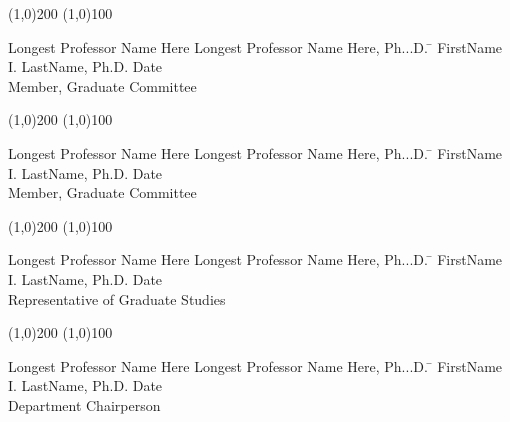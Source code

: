   \noindent
\line(1,0){200} \hspace{40 mm} \line(1,0){100}\\
  \noindent
\vspace{-1.75\baselineskip}
  \begin{tabbing}
Longest Professor Name Here Longest Professor Name Here, Ph...D. \=  \kill 
FirstName I. LastName, Ph.D. \>  Date\\Member, Graduate Committee  %
\end{tabbing}


  \noindent
\line(1,0){200} \hspace{40 mm} \line(1,0){100}\\
  \noindent
\vspace{-1.75\baselineskip}
  \begin{tabbing}
Longest Professor Name Here Longest Professor Name Here, Ph...D.   \=  \kill 
FirstName I. LastName, Ph.D. \>  Date\\Member, Graduate Committee %
\end{tabbing}



  \noindent
\line(1,0){200} \hspace{40 mm} \line(1,0){100}\\
  \noindent
\vspace{-1.75\baselineskip}
  \begin{tabbing}
Longest Professor Name Here Longest Professor Name Here, Ph...D.  \=  \kill 
FirstName I. LastName, Ph.D. \>  Date\\Representative of Graduate Studies  %
\end{tabbing}


  \noindent
  \line(1,0){200} \hspace{40 mm} \line(1,0){100}\\
  \noindent
\vspace{-1.75\baselineskip}
  \begin{tabbing}
Longest Professor Name Here Longest Professor Name Here, Ph...D.  \=  \kill 
FirstName I. LastName, Ph.D. \>  Date\\Department Chairperson  %
\end{tabbing}